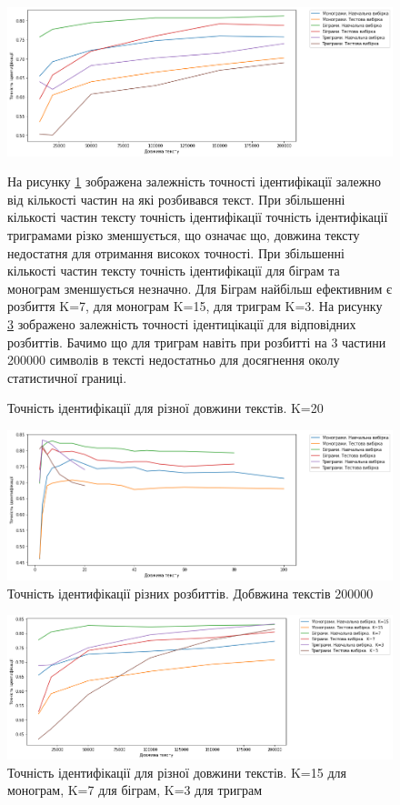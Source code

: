 \documentclass[12pt, a4paper]{extarticle}
\begin{document}
\begin{figure}
\includegraphics[width=\linewidth]{figures/6.png}
\centering
\caption{Точність ідентифікації для різної довжини текстів. K=20}
\label{fig:6}
На рисунку \ref{fig:6} зображена залежність точності ідентифікації залежно від кількості частин на які розбивався текст. При збільшенні кількості частин тексту точність ідентифікації точність ідентифікації триграмами різко зменшується, що означає що, довжина тексту недостатня для отримання високох точності. При збільшенні кількості частин тексту точність ідентифікації для біграм та монограм зменшується незначно. Для Біграм найбільш ефективним є розбиття K=7, для монограм K=15, для триграм K=3. На рисунку \ref{fig:8} зображено залежність точності ідентицікації для відповідних розбиттів. Бачимо що для триграм навіть при розбитті на 3 частини 200000 символів в тексті недостатньо для досягнення околу статистичної границі.
\end{figure}
\begin{figure}
\includegraphics[width=\linewidth]{figures/7.png}
\centering
\caption{Точність ідентифікації різних розбиттів. Добвжина текстів 200000}
\label{fig:7}
\end{figure}
\begin{figure}
\includegraphics[width=\linewidth]{figures/8.png}
\centering
\caption{Точність ідентифікації для різної довжини текстів. K=15 для монограм, K=7 для біграм, K=3 для триграм}
\label{fig:8}
\end{figure}
\end{document}
